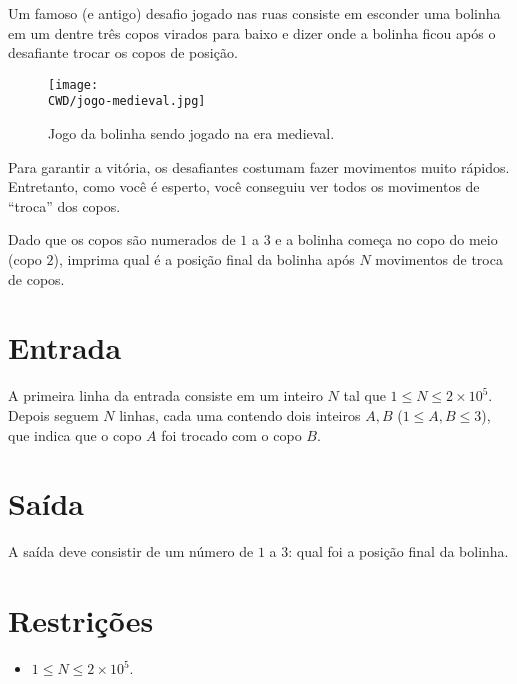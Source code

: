 %

Um famoso (e antigo) desafio jogado nas ruas consiste em esconder uma bolinha em um dentre três copos virados para baixo e dizer onde a bolinha ficou após o desafiante trocar os copos de posição.

\begin{figure}[H]
  \centering
  \texttt{[image: \\CWD/jogo-medieval.jpg]}
  \caption{Jogo da bolinha sendo jogado na era medieval.}
\end{figure}

Para garantir a vitória, os desafiantes costumam fazer movimentos muito rápidos. Entretanto, como você é esperto, você conseguiu ver todos os movimentos de ``troca'' dos copos. 

Dado que os copos são numerados de $1$ a $3$ e a bolinha começa no copo do meio (copo $2$), imprima qual é a posição final da bolinha após $N$ movimentos de troca de copos.

%
%

\section*{Entrada}

A primeira linha da entrada consiste em um inteiro $N$ tal que $1 \leq N \leq 2\times10^5$. Depois seguem $N$ linhas, cada uma contendo dois inteiros $A, B$ ($1 \leq A, B \leq 3$), que indica que o copo $A$ foi trocado com o copo $B$.

%
%

\section*{Saída}

A saída deve consistir de um número de $1$ a $3$: qual foi a posição final da bolinha.

\section*{Restrições}

\begin{itemize}
\item $1 \leq N \leq 2\times 10^5$.
\end{itemize}


\exemplo
